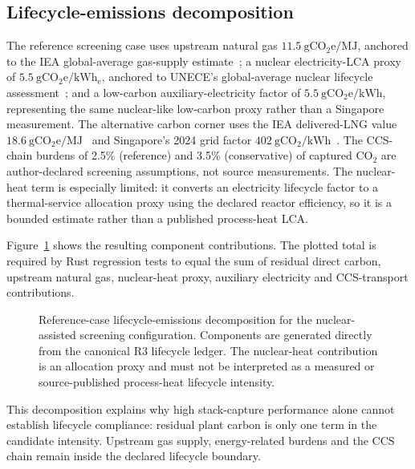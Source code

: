 \subsection{Lifecycle-emissions decomposition}
The reference screening case uses upstream natural gas \(11.5~\mathrm{gCO_2e/MJ}\), anchored to the IEA global-average gas-supply estimate~\cite{iea2026lng}; a nuclear electricity-LCA proxy of \(5.5~\mathrm{gCO_2e/kWh_e}\), anchored to UNECE's global-average nuclear lifecycle assessment~\cite{unece2022lca}; and a low-carbon auxiliary-electricity factor of \(5.5~\mathrm{gCO_2e/kWh}\), representing the same nuclear-like low-carbon proxy rather than a Singapore measurement. The alternative carbon corner uses the IEA delivered-LNG value \(18.6~\mathrm{gCO_2e/MJ}\)~\cite{iea2026lng} and Singapore's 2024 grid factor \(402~\mathrm{gCO_2/kWh}\)~\cite{emagrid2024}. The CCS-chain burdens of 2.5\% (reference) and 3.5\% (conservative) of captured CO$_2$ are author-declared screening assumptions, not source measurements. The nuclear-heat term is especially limited: it converts an electricity lifecycle factor to a thermal-service allocation proxy using the declared reactor efficiency, so it is a bounded estimate rather than a published process-heat LCA.

Figure~\ref{fig:lifecycle-decomposition} shows the resulting component contributions. The plotted total is required by Rust regression tests to equal the sum of residual direct carbon, upstream natural gas, nuclear-heat proxy, auxiliary electricity and CCS-transport contributions.

\begin{figure}[htbp]
\centering
{}
\caption{Reference-case lifecycle-emissions decomposition for the nuclear-assisted screening configuration. Components are generated directly from the canonical R3 lifecycle ledger. The nuclear-heat contribution is an allocation proxy and must not be interpreted as a measured or source-published process-heat lifecycle intensity.}
\label{fig:lifecycle-decomposition}
\end{figure}

This decomposition explains why high stack-capture performance alone cannot establish lifecycle compliance: residual plant carbon is only one term in the candidate intensity. Upstream gas supply, energy-related burdens and the CCS chain remain inside the declared lifecycle boundary.
